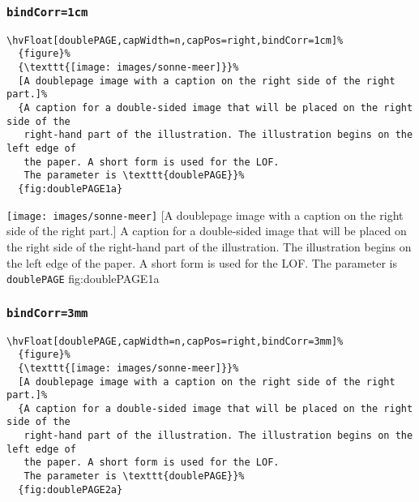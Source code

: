 \documentclass[twoside]{scrartcl}
\makeatletter
\let\hvBlindtext\Blindtext
\def\Blindtext{\par\color{black!40}\hvBlindtext\par\normalcolor}
\def\hvblindtext{\textcolor{black!40}{\blindtext@text}}
\makeatother
\begin{document}
\Blindtext

\Blindtext


\subsubsection{\texttt{bindCorr=1cm}}

\begin{lstlisting}
\hvFloat[doublePAGE,capWidth=n,capPos=right,bindCorr=1cm]%
  {figure}%
  {\texttt{[image: images/sonne-meer]}}%
  [A doublepage image with a caption on the right side of the right part.]%
  {A caption for a double-sided image that will be placed on the right side of the
   right-hand part of the illustration. The illustration begins on the left edge of 
   the paper. A short form is used for the LOF. 
   The parameter is \texttt{doublePAGE}}%
  {fig:doublePAGE1a}
\end{lstlisting}

%
  {\texttt{[image: images/sonne-meer]}}%
  [A doublepage image with a caption on the right side of the right part.]%
  {A caption for a double-sided image that will be placed on the right side of the
   right-hand part of the illustration. The illustration begins on the left edge of 
   the paper. A short form is used for the LOF. 
   The parameter is \texttt{doublePAGE}}%
  {fig:doublePAGE1a}

\hvblindtext

\Blindtext

\Blindtext

\subsubsection{\texttt{bindCorr=3mm}}

\begin{lstlisting}
\hvFloat[doublePAGE,capWidth=n,capPos=right,bindCorr=3mm]%
  {figure}%
  {\texttt{[image: images/sonne-meer]}}%
  [A doublepage image with a caption on the right side of the right part.]%
  {A caption for a double-sided image that will be placed on the right side of the
   right-hand part of the illustration. The illustration begins on the left edge of 
   the paper. A short form is used for the LOF. 
   The parameter is \texttt{doublePAGE}}%
  {fig:doublePAGE2a}
\end{lstlisting}
\end{document}
